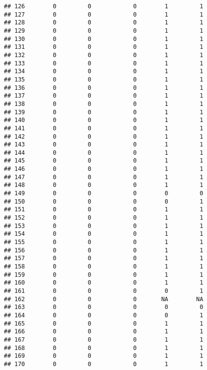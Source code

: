 \documentclass[
]{article}
\begin{document}
\begin{verbatim}
## 126        0         0            0        1         1
## 127        0         0            0        1         1
## 128        0         0            0        1         1
## 129        0         0            0        1         1
## 130        0         0            0        1         1
## 131        0         0            0        1         1
## 132        0         0            0        1         1
## 133        0         0            0        1         1
## 134        0         0            0        1         1
## 135        0         0            0        1         1
## 136        0         0            0        1         1
## 137        0         0            0        1         1
## 138        0         0            0        1         1
## 139        0         0            0        1         1
## 140        0         0            0        1         1
## 141        0         0            0        1         1
## 142        0         0            0        1         1
## 143        0         0            0        1         1
## 144        0         0            0        1         1
## 145        0         0            0        1         1
## 146        0         0            0        1         1
## 147        0         0            0        1         1
## 148        0         0            0        1         1
## 149        0         0            0        0         0
## 150        0         0            0        0         1
## 151        0         0            0        1         1
## 152        0         0            0        1         1
## 153        0         0            0        1         1
## 154        0         0            0        1         1
## 155        0         0            0        1         1
## 156        0         0            0        1         1
## 157        0         0            0        1         1
## 158        0         0            0        1         1
## 159        0         0            0        1         1
## 160        0         0            0        1         1
## 161        0         0            0        0         1
## 162        0         0            0       NA        NA
## 163        0         0            0        0         0
## 164        0         0            0        0         1
## 165        0         0            0        1         1
## 166        0         0            0        1         1
## 167        0         0            0        1         1
## 168        0         0            0        1         1
## 169        0         0            0        1         1
## 170        0         0            0        1         1

\end{verbatim}
\end{document}
